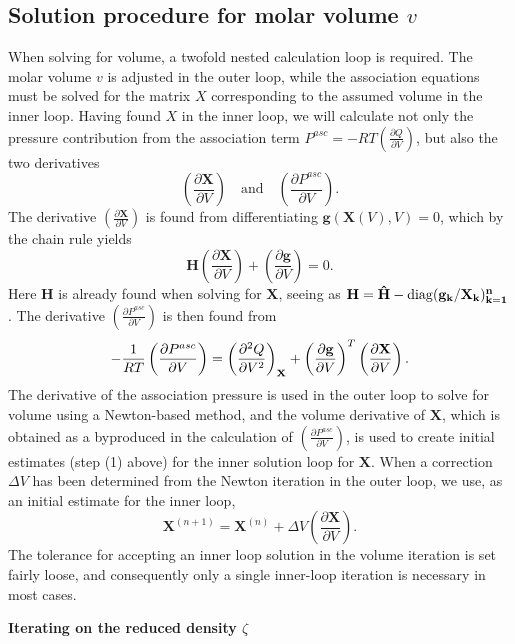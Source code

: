 \documentclass[10pt, a4paper]{article}
\newcommand{\mbf}[0]{\mathbf}
\newcommand*{\pder}[2]{\left(\frac{\partial #1}{\partial #2}\right)}
\newcommand*{\pdder}[2]{\left(\frac{\partial^2 #1}{\partial #2^2}\right)}
\newcommand{\z}{\zeta}
\begin{document}
\subsection{Solution procedure for molar volume $v$}
When solving for volume, a twofold nested calculation loop is required. The molar volume $v$ is adjusted in the outer loop, while the association equations must be solved for the matrix $X$ corresponding to the assumed volume in the inner loop. Having found $X$ in the inner loop, we will calculate not only the pressure contribution from the association term $P^{asc} = -RT \pder{Q}{V}$, but also the two derivatives
\begin{equation}
  \label{advDeriv}
  \pder{\mbf X}{V} \quad \text{and} \quad \pder{P^{asc}}{V}.
\end{equation}
The derivative $\pder{\mbf X}{V}$ is found from differentiating $\mbf g(\mbf X(V),V) = 0$, which by the chain rule yields
\begin{equation}
  \mbf H \pder{\mbf X}{V} + \pder{\mbf g}{V} = 0.
\end{equation}
Here $\mbf H$ is already found when solving for $\mbf X$, seeing as $\bf H = \bf{\hat H} - \mathrm{diag}(\bf g_k/\bf X_k)_{k=1}^n$. The derivative $\pder{P^{asc}}{V}$ is then found from
\begin{equation}
  -\frac{1}{RT} \pder{P^{asc}}{V} = \pdder{Q}{V}_{\mbf X} + \pder{\bf g}{V}^T \pder{\bf X}{V}.
\end{equation}
The derivative of the association pressure is used in the outer loop to solve for volume using a Newton-based method, and the volume derivative of $\mbf X$, which is obtained as a byproduced in the calculation of $\pder{P^{asc}}{V}$, is used to create initial estimates (step (1) above) for the inner solution loop for $\mbf X$. When a correction $\Delta V$ has been determined from the Newton iteration in the outer loop, we use, as an initial estimate for the inner loop,
\begin{equation}
  \mbf X^{(n+1)} = \mbf X^{(n)} + \Delta V \pder{\mbf X}{V}.
\end{equation}
The tolerance for accepting an inner loop solution in the volume iteration is set fairly loose, and consequently only a single inner-loop iteration is necessary in most cases.

\textbf{Iterating on the reduced density $\z$}
\end{document}
